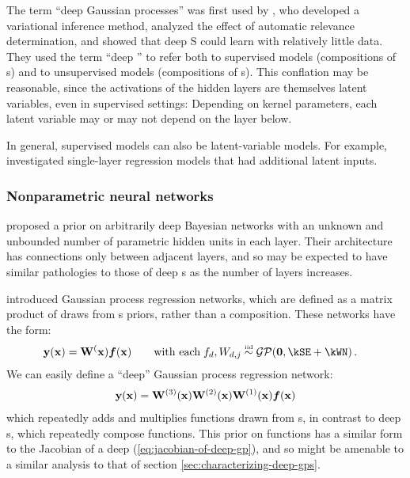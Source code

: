 The term ``deep Gaussian processes'' was first used by \citet{damianou2012deep}, who developed a variational inference method, analyzed the effect of automatic relevance determination, and showed that deep \gp{}S could learn with relatively little data.
%
They used the term ``deep \gp{}'' to refer both to supervised models (compositions of \gp{}s) and to unsupervised models (compositions of \gplvm{}s).
This conflation may be reasonable, since the activations of the hidden layers are themselves latent variables, even in supervised settings:
Depending on kernel parameters, each latent variable may or may not depend on the layer below.

In general, supervised models can also be latent-variable models.
For example, \citet{wang2012gaussian} investigated single-layer \gp{} regression models that had additional latent inputs.

\subsubsection{Nonparametric neural networks}
\citet{adams2010learning} proposed a prior on arbitrarily deep Bayesian networks with an unknown and unbounded number of parametric hidden units in each layer.
Their architecture has connections only between adjacent layers, and so may be expected to have similar pathologies to those of deep \gp{}s as the number of layers increases.

\citet{wilson2012gaussian} introduced Gaussian process regression networks, which are defined as a matrix product of draws from \gp{}s priors, rather than a composition.
These networks have the form:
%
\begin{align}
\vy(\vx) & = \vW^(\vx) \vf(\vx) \qquad \textnormal{with each} \; f_{d}, W_{d,j} \simiid \GPt{\vzero}{\kSE + \kWN} .
\end{align}
%
We can easily define a ``deep'' Gaussian process regression network:
%
\begin{align}
{\bf{y}}({\bf{x}}) = \mathbf{W}^{(3)}({\bf{x}}) \mathbf{W}^{(2)}({\bf{x}}) \mathbf{W}^{(1)}({\bf{x}}) \boldsymbol{f}({\bf{x}})
\end{align}
%
which repeatedly adds and multiplies functions drawn from \gp{}s, in contrast to deep \gp{}s, which repeatedly compose functions.
This prior on functions has a similar form to the Jacobian of a deep \gp{} (\cref{eq:jacobian-of-deep-gp}), and so might be amenable to a similar analysis to that of section \ref{sec:characterizing-deep-gps}.

